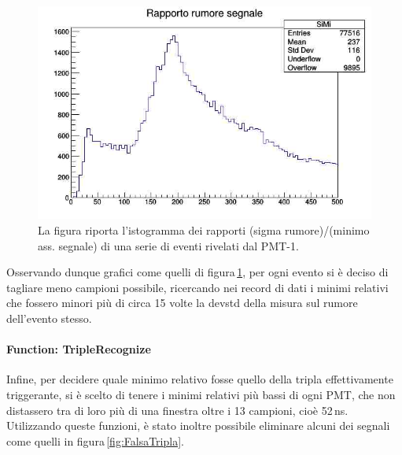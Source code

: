 \documentclass[a4paper,twocolumn]{article}
\begin{document}
\begin{figure}
\centering
\includegraphics[scale=0.4]{./immagini/TimeOfFlight/RappRumSeg.jpg}
\caption{La figura riporta l'istogramma dei rapporti (sigma rumore)/(minimo ass. segnale) di una serie di eventi rivelati dal PMT-1.}
\label{fig:RappSiMe}
\end{figure}

Osservando dunque grafici come quelli di figura\,\ref{fig:RappSiMe}, per ogni evento si è deciso di tagliare meno campioni possibile, ricercando nei record di dati i minimi relativi che fossero minori più di circa 15 volte la devstd della misura sul rumore dell'evento stesso.
\paragraph{Function: TripleRecognize}
Infine, per decidere quale minimo relativo fosse quello della tripla effettivamente triggerante, si è scelto di tenere i minimi relativi più bassi di ogni PMT, che non distassero tra di loro più di una finestra oltre i 13 campioni, cioè 52\,ns.\\
Utilizzando queste funzioni, è stato inoltre possibile eliminare alcuni dei segnali come quelli in figura\,\ref{fig:FalsaTripla}.
\end{document}

